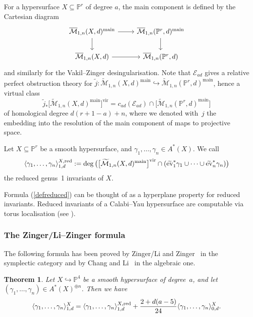 \documentclass[pdftex]{sigma}
\numberwithin{equation}{section}
\newtheorem{Theorem}{Theorem}[section]
\newcommand{\vv}{\mathrm{vir}}
\newcommand{\PP}{\mathbb P}
\newcommand{\MM}[4]{\overline{\mathcal M}_{#1,#2}(#3,#4)}
\begin{document}
For a hypersurface $X\subseteq \mathbb P^r$ of degree $a$, the main component is defined by the Cartesian diagram
\[
 \begin{tikzcd}
 \MM{1}{n}{X}{d}^\text{main} \ar[r]\ar[d] & \MM{1}{n}{\mathbb P^r}{d}^\text{main} \ar[d] \\
 \MM{1}{n}{X}{d} \ar[r] & \MM{1}{n}{\mathbb P^r}{d}
 \end{tikzcd}
\]
and similarly for the Vakil--Zinger desingularisation. Note that $\mathcal{E}_{ad}$ gives a relative perfect obstruction theory for $\tilde{j}\colon \widetilde{\mathcal M}_{1,n}(X,d)^\text{main} \hookrightarrow\widetilde{\mathcal M}_{1,n}(\mathbb P^r,d)^\text{main} $, hence a virtual class
\begin{equation}\label{defreduced}
\tilde{j}_*\big[\widetilde{\mathcal M}_{1,n}(X,d)^\text{main}\big]^{\vv}=c_{ad}(\mathcal{E}_{ad})\cap\big[\widetilde{\mathcal M}_{1,n}({\mathbb P^r},{d})^\text{main}\big]
\end{equation}
of homological degree $d(r+1-a)+n$, where we denoted with~$j$ the embedding into the resolution of the main component of maps to projective space.

\begin{Definition} Let $X\subseteq \mathbb P^r$ be a smooth hypersurface, and $\gamma_1,\ldots,\gamma_n\in A^*(X)$. We call
\[ \langle\gamma_1,\ldots,\gamma_n\rangle_{1,d}^{X,{\rm red}}:=
\deg \big(\big[\widetilde{\mathcal M}_{1,n}(X,d)^\text{main}\big]^{\vv}\cap( \widetilde{\mathrm{ev}}_1^*\gamma_1\cup\dots\cup \widetilde{\mathrm{ev}}_n^*\gamma_n)\big)
\]
the reduced genus~1 invariants of $X$.
\end{Definition}

\begin{Remark} Formula (\ref{defreduced}) can be thought of as a hyperplane property for reduced invariants. Reduced invariants of a Calabi--Yau hypersurface are computable via torus localisation (see \cite{zingred}).
\end{Remark}

\subsubsection{The Zinger/Li--Zinger formula}
The following formula has been proved by Zinger/Li and Zinger~\cite{LZ, zingerstvsred,redgone} in the symplectic category and by Chang and Li~\cite{CL-formula} in the algebraic one.

\begin{Theorem}\label{lizinger}
 Let $X\hookrightarrow\PP^4$ be a smooth hypersurface of degree~$a$, and let $(\gamma_1,\ldots, \gamma_n)\in A^*(X)^{\oplus n}$. Then we have
 \[
 \langle\gamma_1,\ldots,\gamma_n\rangle^X_{1,d}= \langle\gamma_1,\ldots,\gamma_n\rangle_{1,d}^{X,{\rm red}}+\frac{2+d(a-5)}{24} \langle\gamma_1,\ldots,\gamma_n\rangle^X_{0,d}.
 \]
\end{Theorem}
\end{document}
